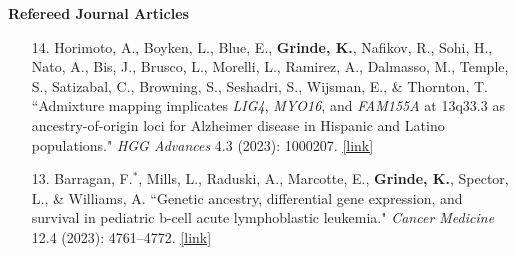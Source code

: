\documentclass[margin]{res}
\begin{document}
\begin{resume}
\textbf{Refereed Journal Articles}

\begin{itemize}
\item[14.] Horimoto, A., Boyken, L., Blue, E., \textbf{Grinde, K.}, Nafikov, R., Sohi, H., Nato, A., Bis, J., Brusco, L., Morelli, L., Ramirez, A., Dalmasso, M.,  Temple, S., Satizabal, C., Browning, S., Seshadri, S., Wijsman, E., \& Thornton, T. ``Admixture mapping implicates \textit{LIG4}, \textit{MYO16}, and \textit{FAM155A} at 13q33.3 as ancestry-of-origin loci for Alzheimer disease in Hispanic and Latino populations." \textit{HGG Advances} 4.3 (2023): 1000207.  
\href{https://www.cell.com/hgg-advances/pdf/S2666-2477(23)00039-8.pdf}{[link]}

\item[13.] Barragan, F.$^*$, Mills, L., Raduski, A., Marcotte, E., \textbf{Grinde, K.}, Spector, L., \& Williams, A. ``Genetic ancestry, differential gene expression, and survival in pediatric b-cell acute lymphoblastic leukemia." \textit{Cancer Medicine} 12.4 (2023): 4761--4772.
\href{https://onlinelibrary.wiley.com/doi/full/10.1002/cam4.5266}{[link]}



\end{itemize}
\end{resume}
\end{document}
